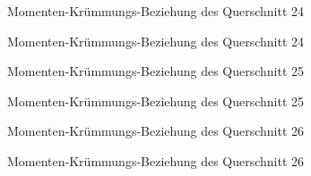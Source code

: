 \documentclass[
  11pt,
  letterpaper,
]{scrreprt}
\begin{document}
\begin{figure}[H]


\caption{\label{fig-qs_24}Momenten-Krümmungs-Beziehung des Querschnitt
24}

\end{figure}%

\begin{figure}[H]


\caption{\label{fig-m_chi_24}Momenten-Krümmungs-Beziehung des
Querschnitt 24}

\end{figure}%

\begin{figure}[H]


\caption{\label{fig-qs_25}Momenten-Krümmungs-Beziehung des Querschnitt
25}

\end{figure}%

\begin{figure}[H]


\caption{\label{fig-m_chi_25}Momenten-Krümmungs-Beziehung des
Querschnitt 25}

\end{figure}%

\begin{figure}[H]


\caption{\label{fig-qs_26}Momenten-Krümmungs-Beziehung des Querschnitt
26}

\end{figure}%

\begin{figure}[H]


\caption{\label{fig-m_chi_26}Momenten-Krümmungs-Beziehung des
Querschnitt 26}

\end{figure}%
\end{document}
